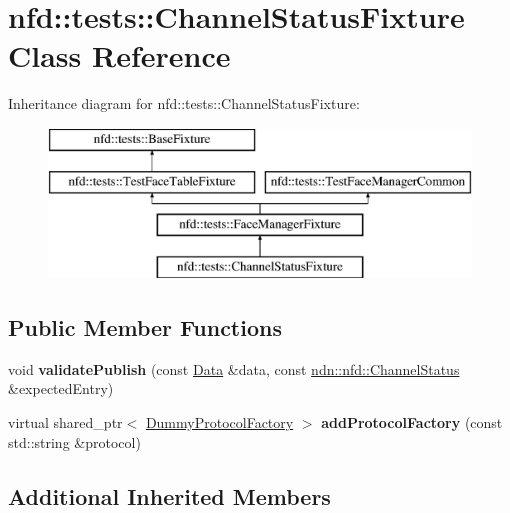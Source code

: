 \hypertarget{classnfd_1_1tests_1_1ChannelStatusFixture}{}\section{nfd\+:\+:tests\+:\+:Channel\+Status\+Fixture Class Reference}
\label{classnfd_1_1tests_1_1ChannelStatusFixture}
Inheritance diagram for nfd\+:\+:tests\+:\+:Channel\+Status\+Fixture\+:\begin{figure}[H]
\begin{center}
\leavevmode
\includegraphics[height=4.000000cm]{classnfd_1_1tests_1_1ChannelStatusFixture}
\end{center}
\end{figure}
\subsection*{Public Member Functions}
\begin{DoxyCompactItemize}
\item 
void {\bfseries validate\+Publish} (const \hyperlink{classndn_1_1Data}{Data} \&data, const \hyperlink{classndn_1_1nfd_1_1ChannelStatus}{ndn\+::nfd\+::\+Channel\+Status} \&expected\+Entry)\hypertarget{classnfd_1_1tests_1_1ChannelStatusFixture_abdacb8c8510003515a6d10cccd9fdf42}{}\label{classnfd_1_1tests_1_1ChannelStatusFixture_abdacb8c8510003515a6d10cccd9fdf42}

\item 
virtual shared\+\_\+ptr$<$ \hyperlink{classnfd_1_1tests_1_1DummyProtocolFactory}{Dummy\+Protocol\+Factory} $>$ {\bfseries add\+Protocol\+Factory} (const std\+::string \&protocol)\hypertarget{classnfd_1_1tests_1_1ChannelStatusFixture_a365438d604e8b60a60df7e94af14f21f}{}\label{classnfd_1_1tests_1_1ChannelStatusFixture_a365438d604e8b60a60df7e94af14f21f}

\end{DoxyCompactItemize}
\subsection*{Additional Inherited Members}


